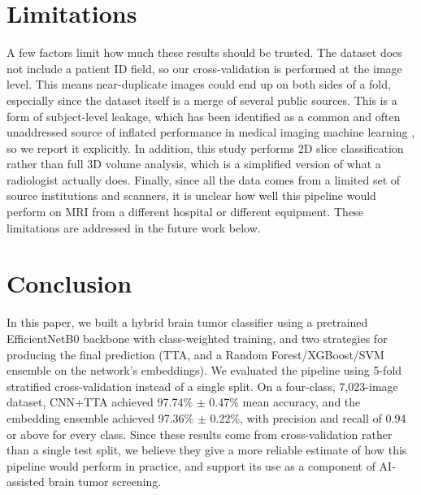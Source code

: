 \documentclass[conference]{IEEEtran}
\begin{document}
\section{Limitations}
A few factors limit how much these results should be trusted. The dataset does not include a patient ID field, so our cross-validation is performed at the image level. This means near-duplicate images could end up on both sides of a fold, especially since the dataset itself is a merge of several public sources. This is a form of subject-level leakage, which has been identified as a common and often unaddressed source of inflated performance in medical imaging machine learning \cite{varoquaux2022leakage}, so we report it explicitly. In addition, this study performs 2D slice classification rather than full 3D volume analysis, which is a simplified version of what a radiologist actually does. Finally, since all the data comes from a limited set of source institutions and scanners, it is unclear how well this pipeline would perform on MRI from a different hospital or different equipment. These limitations are addressed in the future work below.


\section{Conclusion}
In this paper, we built a hybrid brain tumor classifier using a pretrained EfficientNetB0 backbone with class-weighted training, and two strategies for producing the final prediction (TTA, and a Random Forest/XGBoost/SVM ensemble on the network's embeddings). We evaluated the pipeline using 5-fold stratified cross-validation instead of a single split. On a four-class, 7,023-image dataset, CNN+TTA achieved 97.74\% $\pm$ 0.47\% mean accuracy, and the embedding ensemble achieved 97.36\% $\pm$ 0.22\%, with precision and recall of 0.94 or above for every class. Since these results come from cross-validation rather than a single test split, we believe they give a more reliable estimate of how this pipeline would perform in practice, and support its use as a component of AI-assisted brain tumor screening.
\end{document}

